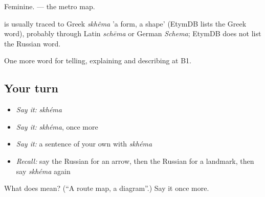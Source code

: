 Feminine. \emph{ } — the metro map.

\begin{cousinweb}
\emph{} is usually traced to Greek \emph{skhêma} 'a form, a shape' (EtymDB lists the Greek word), probably through Latin \emph{schēma} or German \emph{Schema}; EtymDB does not list the Russian word.
\end{cousinweb}

\begin{grammarlens}[title={What you've built}]
One more word for telling, explaining and describing at B1.
\end{grammarlens}

\subsection*{Your turn}
\begin{itemize}
\raggedright
  \item \emph{Say it:} \emph{skhéma}
  \item \emph{Say it:} \emph{skhéma}, once more
  \item \emph{Say it:} a sentence of your own with \emph{skhéma}
  \item \emph{Recall:} say the Russian for an arrow, then the Russian for a landmark, then say \emph{skhéma} again
\end{itemize}

\begin{tcolorbox}[breakable,colback=teal!4,colframe=teal!35!black,title={Before you move on}]
What does  mean? (\textquotedblleft{}A route map, a diagram\textquotedblright{}.) Say it once more.
\end{tcolorbox}
